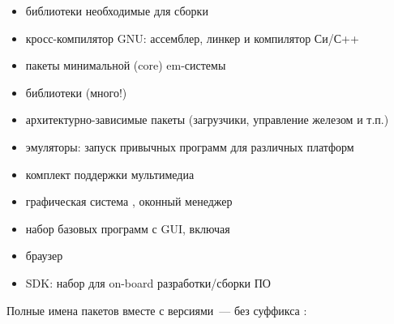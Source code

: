 {\begin{itemize}
  \item библиотеки необходимые для сборки 
  \item кросс-компилятор GNU: ассемблер, линкер и компилятор Си/С++
  \item пакеты минимальной (core) em\linux-системы
  \item библиотеки (много!)
  \item архитектурно-зависимые пакеты (загрузчики, управление железом и т.п.)
  \item эмуляторы: запуск привычных программ для различных платформ
  \item комплект поддержки мультимедиа
  \item графическая система , оконный менеджер
  \item набор базовых программ с GUI, включая
  \item браузер
  \item SDK: набор для on-board разработки/сборки ПО
\end{itemize}


Полные имена пакетов вместе с версиями\ --- без суффикса : 


}
